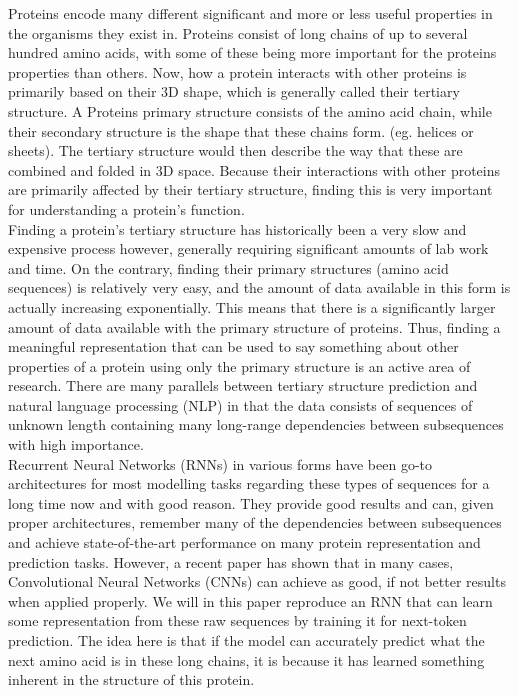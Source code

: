 %
Proteins encode many different significant and more or less useful properties in the organisms they exist in. Proteins consist of long chains of up to several hundred amino acids, with some of these being more important for the proteins properties than others. Now, how a protein interacts with other proteins is primarily based on their $3$D shape, which is generally called their tertiary structure. A Proteins primary structure consists of the amino acid chain, while their secondary structure is the shape that these chains form. (eg. helices or sheets). The tertiary structure would then describe the way that these are combined and folded in $3$D space. Because their interactions with other proteins are primarily affected by their tertiary structure, finding this is very important for understanding a protein's function. \\

\noindent
Finding a protein's tertiary structure has historically been a very slow and expensive process however, generally requiring significant amounts of lab work and time. On the contrary, finding their primary structures (amino acid sequences) is relatively very easy, and the amount of data available in this form is actually increasing exponentially.\cite{seqcount} This means that there is a significantly larger amount of data available with the primary structure of proteins. Thus, finding a meaningful representation that can be used to say something about other properties of a protein using only the primary structure is an active area of research. There are many parallels between tertiary structure prediction and natural language processing (NLP) in that the data consists of sequences of unknown length containing many long-range dependencies between subsequences with high importance.\\

\noindent
Recurrent Neural Networks (RNNs) in various forms have been go-to architectures for most modelling tasks regarding these types of sequences for a long time now and with good reason. They provide good results and can, given proper architectures, remember many of the dependencies between subsequences and achieve state-of-the-art performance on many protein representation and prediction tasks. However, a recent paper has shown that in many cases, Convolutional Neural Networks (CNNs) can achieve as good, if not better results when applied properly.\cite{intro} We will in this paper reproduce an RNN that can learn some representation from these raw sequences by training it for next-token prediction.\cite{unirep} The idea here is that if the model can accurately predict what the next amino acid is in these long chains, it is because it has learned something inherent in the structure of this protein.\\

